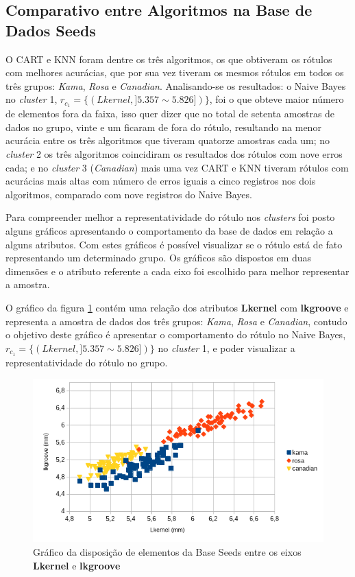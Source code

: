 \subsection{Comparativo entre Algoritmos na Base de Dados Seeds} \label{cap:resultados:ssec:compalgoritmos:seeds}
O CART e KNN foram dentre os três algoritmos, os que obtiveram os rótulos com melhores acurácias, que por sua vez tiveram os mesmos rótulos em todos os três grupos: \textit{Kama}, \textit{Rosa} e \textit{Canadian}. Analisando-se os resultados: o Naive Bayes no \textit{cluster} 1, ${r_{c_1}=\{ (Lkernel, ] 5.357 \sim  5.826 ]) \} }$, foi o que obteve maior número de elementos fora da faixa, isso quer dizer que no total de setenta amostras de dados no grupo, vinte e um ficaram de fora do rótulo, resultando na menor acurácia entre os três algoritmos que tiveram quatorze amostras cada um; no \textit{cluster} 2 os três algoritmos coincidiram os resultados dos rótulos com nove erros cada; e no \textit{cluster} 3 (\textit{Canadian}) mais uma vez CART e KNN tiveram rótulos com acurácias mais altas com número de erros iguais a cinco registros nos dois algoritmos, comparado com nove registros  do Naive Bayes.

Para compreender melhor a representatividade do rótulo nos \textit{clusters} foi posto alguns gráficos apresentando o comportamento da base de dados em relação a alguns atributos. Com estes gráficos é possível visualizar se o rótulo está de fato representando um determinado grupo. Os gráficos são dispostos em duas dimensões e o atributo referente a cada eixo foi escolhido para melhor representar a amostra.

O gráfico da figura \ref{fig:grafico_NB_cluster1_lkernel_lkgroove_seeds} contém uma relação dos atributos \textbf{Lkernel} com \textbf{lkgroove} e representa a amostra de dados dos três grupos: \textit{Kama}, \textit{Rosa} e \textit{Canadian}, contudo o objetivo deste gráfico é apresentar o comportamento do rótulo  no Naive Bayes, ${r_{c_1}=\{ (Lkernel, ] 5.357 \sim  5.826 ]) \} }$ no \textit{cluster} 1, e poder visualizar a representatividade do rótulo no grupo.

\begin{figure}[h!]
        \centering
        \includegraphics[scale=0.9]{figs/grafico_NB_cluster1_lkernel_lkgroove_seeds.png}
        \caption{Gráfico da disposição de elementos da Base Seeds entre os eixos \textbf{Lkernel} e \textbf{lkgroove}} \label{fig:grafico_NB_cluster1_lkernel_lkgroove_seeds}
\end{figure}

